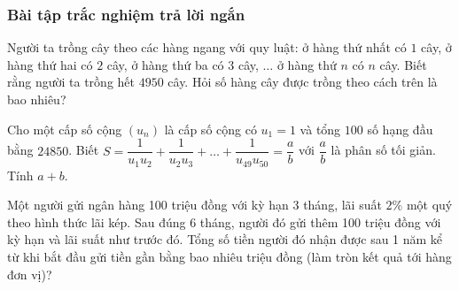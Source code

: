 \subsubsection{Bài tập trắc nghiệm trả lời ngắn}
\begin{ex}%
	Người ta trồng cây theo các hàng ngang với quy luật: ở hàng thứ nhất có $1$ cây, ở hàng thứ hai có $2$ cây, ở hàng thứ ba có $3$ cây, $\ldots$ ở hàng thứ $n$ có $n$ cây. Biết rằng người ta trồng hết $4950$ cây. Hỏi số hàng cây được trồng theo cách trên là bao nhiêu?
\end{ex}
\begin{ex}%
Cho một cấp số cộng $\left(u_{n}\right)$ là cấp số cộng có $u_{1}=1$ và tổng $100$ số hạng đầu bằng $24850$. Biết $S=\dfrac{1}{u_{1} u_{2}}+\dfrac{1}{u_{2} u_{3}}+\ldots+\dfrac{1}{u_{49} u_{50}}=\dfrac{a}{b}$ với $\dfrac{a}{b}$ là phân số tối giản. Tính $a+b$.
\end{ex}
\begin{ex}%
	Một người gửi ngân hàng 100 triệu đồng với kỳ hạn 3 tháng, lãi suất $2\%$ một quý theo hình thức lãi kép. Sau đúng 6 tháng, người đó gửi thêm 100 triệu đồng với kỳ hạn và lãi suất như trước đó. Tổng số tiền người đó nhận được sau 1 năm kể từ khi bắt đầu gửi tiền gần bằng bao nhiêu triệu đồng (làm tròn kết quả tới hàng đơn vị)?
\end{ex}
